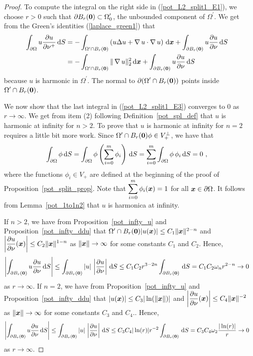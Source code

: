 \begin{proof}
To compute the integral on the right side in (\ref{pot_L2_split1_E1}),
we choose $r>0$ such that
$\displaystyle \partial B_r({\bm{0}}) \subset \Omega_0^{\prime}$,
the unbounded component of $\displaystyle \Omega^{\prime}$.
We get from the Green's identities (\ref{laplace_green1}) that
\begin{align}
\int_{\partial \Omega} u \frac{\partial{u}}{\partial \nu^+} \,\mathrm{d}{S} 
&= -\int_{\Omega^{\prime} \cap B_r({\bm{0}})}
\left( u \Delta u + \operatorname{\nabla} u \cdot \operatorname{\nabla} u \right)
\,\mathrm{d}{{\bm{x}}} + \int_{\partial B_r({\bm{0}})} u \frac{\partial{u}}{\partial \nu} \,\mathrm{d}{S}
\nonumber \\
&= -\int_{\Omega^{\prime} \cap B_r({\bm{0}})} \|\operatorname{\nabla} u\|_2^2 \,\mathrm{d}{{\bm{x}}}
+ \int_{\partial B_r({\bm{0}})} u \frac{\partial{u}}{\partial \nu} \,\mathrm{d}{S}
\label{pot_L2_split1_E3}
\end{align}
because $u$ is harmonic in $\displaystyle \Omega^{\prime}$.  The
normal to $\displaystyle \partial (\Omega^{\prime} \cap B_r({\bm{0}}))$
points inside $\displaystyle \Omega^{\prime} \cap B_r({\bm{0}})$.

We now show that the last integral in (\ref{pot_L2_split1_E3}) converges
to $0$ as $r \to \infty$.  We get from item (2) following
Definition~\ref{pot_spl_def} that $u$ is harmonic at infinity for
$n>2$.  To prove that $u$ is harmonic at infinity for $n=2$ requires a
little bit more work.  Since
$\Omega^{\prime} \cap B_r({\bm{0}})\phi \in V_+^\perp$, we have that
\[
\int_{\partial \Omega} \phi \dx{S}
= \int_{\partial \Omega} \phi \left( \sum_{i=0}^m \phi_i\right) \dx{S}
= \sum_{i=0}^m \int_{\partial \Omega} \phi \,\phi_i \dx{S} = 0 \ ,
\]
where the functions $\phi_i \in V_+$ are defined at the beginning of
the proof of Proposition~\ref{pot_split_prop}.  Note that
$\displaystyle \sum_{i=0}^m \phi_i({\bm{x}}) = 1$ for all
${\bm{x}} \in \partial \Omega$.  It follows from
Lemma~\ref{pot_1to1n2} that $u$ is harmonica at infinity.

If $n>2$, we have from Proposition~\ref{pot_infty_u} and
Proposition~\ref{pot_infty_ddu} that
$\Omega^{\prime} \cap B_r({\bm{0}})|u({\bm{x}})| \leq C_1\|{\bm{x}}\|^{2-n}$ and
$\displaystyle \left| \frac{\partial{u}}{\partial \nu}({\bm{x}})\right| \leq
C_2 \|{\bm{x}}\|^{1-n}$ as $\|{\bm{x}}\| \rightarrow \infty$ for some
constants $C_1$ and $C_2$.  Hence,
\[
\left| \int_{\partial B_r({\bm{0}})} u \frac{\partial{u}}{\partial \nu} \,\mathrm{d}{S} \right|
\leq \int_{\partial B_r({\bm{0}})} |u|\,\left|\frac{\partial{u}}{\partial \nu} \right| \,\mathrm{d}{S}
\leq C_1C_2 r^{3-2n} \int_{\partial B_r({\bm{0}})} \,\mathrm{d}{S}
= C_1C_2 \omega_n r^{2-n}  \to 0 
\]
as $r \to \infty$.
If $n=2$, we have from Proposition~\ref{pot_infty_u} and
Proposition~\ref{pot_infty_ddu} that
$|u({\bm{x}})| \leq C_3|\ln(\|{\bm{x}}\|)|$ and
$\displaystyle \left| \frac{\partial{u}}{\partial \nu}({\bm{x}})\right| \leq
C_4 \|{\bm{x}}\|^{-2}$ as $\|{\bm{x}}\| \rightarrow \infty$ for some
constants $C_3$ and $C_4$..  Hence,
\[
\left| \int_{\partial B_r({\bm{0}})} u \frac{\partial{u}}{\partial \nu} \,\mathrm{d}{S} \right|
\leq \int_{\partial B_r({\bm{0}})} |u|\,\left|\frac{\partial{u}}{\partial \nu} \right| \,\mathrm{d}{S}
\leq C_3C_4 |\ln(r)| r^{-2} \int_{\partial B_r({\bm{0}})} \,\mathrm{d}{S}
= C_3C_4 \omega_2 \frac{|\ln(r)|}r \to 0 
\]
as $r \to \infty$.


\end{proof}

